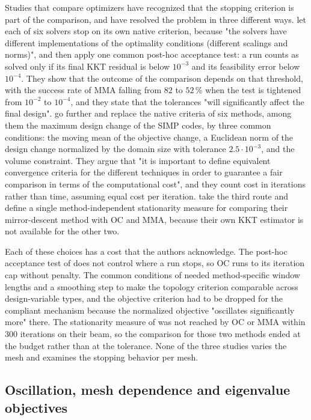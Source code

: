 \documentclass[11pt,a4paper]{article}
\begin{document}
Studies that compare optimizers have recognized that the stopping criterion is part of the comparison, and have resolved the problem in three different ways. \citet{RojasLabanda2015} let each of six solvers stop on its own native criterion, because "the solvers have different implementations of the optimality conditions (different scalings and norms)", and then apply one common post-hoc acceptance test: a run counts as solved only if its final KKT residual is below $10^{-3}$ and its feasibility error below $10^{-4}$. They show that the outcome of the comparison depends on that threshold, with the success rate of MMA falling from $82$ to $52\,\%$ when the test is tightened from $10^{-2}$ to $10^{-4}$, and they state that the tolerances "will significantly affect the final design". \citet{Yago2022} go further and replace the native criteria of six methods, among them the maximum design change of the SIMP codes, by three common conditions: the moving mean of the objective change, a Euclidean norm of the design change normalized by the domain size with tolerance $2.5\cdot10^{-3}$, and the volume constraint. They argue that "it is important to define equivalent convergence criteria for the different techniques in order to guarantee a fair comparison in terms of the computational cost", and they count cost in iterations rather than time, assuming equal cost per iteration. \citet{Kim2025} take the third route and define a single method-independent stationarity measure for comparing their mirror-descent method with OC and MMA, because their own KKT estimator is not available for the other two.

Each of these choices has a cost that the authors acknowledge. The post-hoc acceptance test of \citet{RojasLabanda2015} does not control where a run stops, so OC runs to its iteration cap without penalty. The common conditions of \citet{Yago2022} needed method-specific window lengths and a smoothing step to make the topology criterion comparable across design-variable types, and the objective criterion had to be dropped for the compliant mechanism because the normalized objective "oscillates significantly more" there. The stationarity measure of \citet{Kim2025} was not reached by OC or MMA within $300$ iterations on their beam, so the comparison for those two methods ended at the budget rather than at the tolerance. None of the three studies varies the mesh and examines the stopping behavior per mesh.

\subsection{Oscillation, mesh dependence and eigenvalue objectives}
\end{document}
